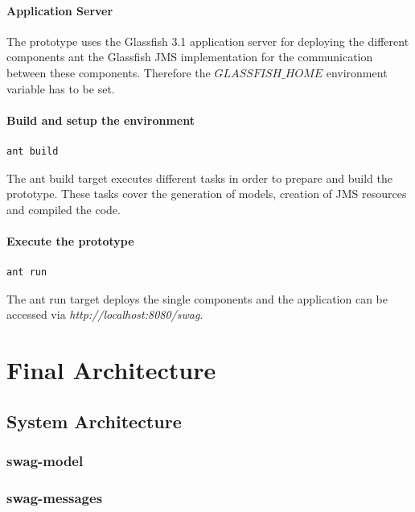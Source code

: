 \documentclass[a4paper]{article}
\begin{document}
\paragraph{Application Server}
The prototype uses the Glassfish 3.1 application server for deploying the different components ant the Glassfish JMS implementation for the communication between these components. Therefore the $GLASSFISH\_HOME$ environment variable has to be set.

\paragraph{Build and setup the environment}
\begin{verbatim}
ant build
\end{verbatim}

The ant build target executes different tasks in order to prepare and build the prototype. These tasks cover the generation of models, creation of JMS resources and compiled the code. 



\paragraph{Execute the prototype}
\begin{verbatim}
ant run
\end{verbatim}

The ant run target deploys the single components and the application can be accessed via \emph{http://localhost:8080/swag}.



\section{Final Architecture}


\subsection{System Architecture}

\subsubsection{swag-model}

\subsubsection{swag-messages}
\end{document}

